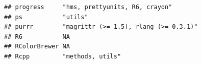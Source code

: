 \documentclass[]{article}
\begin{document}
\begin{verbatim}
## progress     "hms, prettyunits, R6, crayon"                                                                                                                                                                                                                                                                                                                                                                                                                                                        
## ps           "utils"                                                                                                                                                                                                                                                                                                                                                                                                                                                                               
## purrr        "magrittr (>= 1.5), rlang (>= 0.3.1)"                                                                                                                                                                                                                                                                                                                                                                                                                                                 
## R6           NA                                                                                                                                                                                                                                                                                                                                                                                                                                                                                    
## RColorBrewer NA                                                                                                                                                                                                                                                                                                                                                                                                                                                                                    
## Rcpp         "methods, utils"                                                                                                                                                                                                                                                                                                                                                                                                                                                                      

\end{verbatim}
\end{document}
